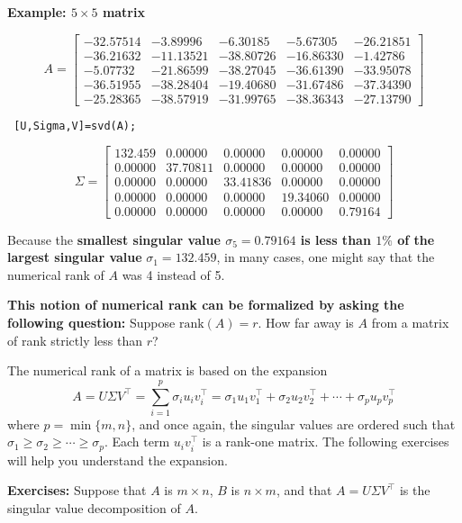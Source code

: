 \documentclass[letterpaper]{article}
\begin{document}
\newpage


\textbf{Example: $5 \times 5$ matrix}

$$A=\left[ \begin{array}{rrrrr}-32.57514& -3.89996& -6.30185& -5.67305& -26.21851\\-36.21632& -11.13521& -38.80726& -16.86330& -1.42786\\-5.07732& -21.86599& -38.27045& -36.61390& -33.95078\\-36.51955& -38.28404& -19.40680& -31.67486& -37.34390\\-25.28365& -38.57919& -31.99765& -38.36343& -27.13790\end{array}
 \right] $$

 \begin{verbatim}
 [U,Sigma,V]=svd(A);
 \end{verbatim}

 $$ \Sigma=\left[\begin{array}{rrrrr}132.459& 0.00000&0.00000&0.00000&0.00000\\0.00000&37.70811& 0.00000&0.00000&0.00000\\0.00000&0.00000&33.41836& 0.00000&0.00000\\0.00000&0.00000&0.00000&19.34060& 0.00000\\0.00000& 0.00000& 0.00000& 0.00000& 0.79164\end{array}\right] $$


Because the \textbf{smallest singular value $\sigma_5 = 0.79164$  is less than $1\%$ of the largest singular value} $\sigma_1=132.459$, in many cases, one might say that the numerical rank of $A$ was 4 instead of 5.

\textbf{This notion of numerical rank can be formalized by asking the following question:} Suppose $\text{rank}(A) = r$. How far away is $A$ from a matrix of rank strictly less than $r$?

\newpage

The numerical rank of a matrix is based on the expansion
$$A=U \Sigma V^\top = \sum_{i=1}^{p} \sigma_i u_i v_i^\top = \sigma_1 u_1 v_1^\top + \sigma_2 u_2 v_2^\top + \cdots + \sigma_p u_p v_p^\top  $$
where $p=\min\{m, n\}$, and once again, the singular values are ordered such that $\sigma_1 \ge \sigma_2\ge \cdots \ge \sigma_p.$ Each term $u_iv_i^\top$ is a rank-one matrix. The following exercises will help you understand the expansion.

\textbf{Exercises:} Suppose that $A$ is $m \times n$, $B$ is $n \times m $, and that $A=U \Sigma V^\top $ is the singular value decomposition of $A$.
\end{document}
